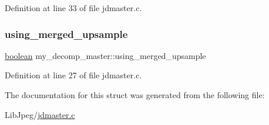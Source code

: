 Definition at line 33 of file jdmaster.\+c.

\mbox{\label{structmy__decomp__master_af7ab207dfbf091b4de60e6fe3938f4a4}} 
\subsubsection{\texorpdfstring{using\_merged\_upsample}{using\_merged\_upsample}}
{\footnotesize\ttfamily \mbox{\hyperlink{jmorecfg_8h_a7c6368b321bd9acd0149b030bb8275ed}{boolean}} my\+\_\+decomp\+\_\+master\+::using\+\_\+merged\+\_\+upsample}



Definition at line 27 of file jdmaster.\+c.



The documentation for this struct was generated from the following file\+:\begin{DoxyCompactItemize}
\item 
Lib\+Jpeg/\mbox{\hyperlink{jdmaster_8c}{jdmaster.\+c}}\end{DoxyCompactItemize}
